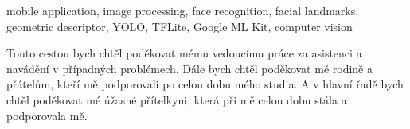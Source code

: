 \documentclass[FM,BP,CZ]{tulthesis}
\begin{document}
\begin{keywordsEN}
mobile application, image processing, face recognition, facial landmarks, geometric descriptor, YOLO, TFLite, Google ML Kit, computer vision
\end{keywordsEN}

\clearpage

\begin{acknowledgement}
Touto cestou bych chtěl poděkovat mému vedoucímu práce za asistenci a navádění v případných problémech.
\newline Dále bych chtěl poděkovat mé rodině a přátelům, kteří mě podporovali po celou dobu mého studia.
\newline A v hlavní řadě bych chtěl poděkovat mé úžasné přítelkyni, která při mě celou dobu stála a podporovala mě.
\end{acknowledgement}

\tableofcontents

\clearpage
\end{document}
